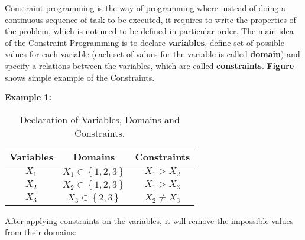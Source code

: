 Constraint programming is the way of programming where instead of doing a continuous sequence of task to be executed, it requires to write the properties of the problem, which is not need to be defined in particular order. The main idea of the Constraint Programming is to declare \textbf{variables}, define set of possible values for each variable (each set of values for the variable is called \textbf{domain}) and specify a relations between the variables, which are called \textbf{constraints}. \textbf{Figure} shows simple example of the Constraints\cite{hanbook_cp,nonogram_good,}.

\begin{addmargin}[4em]{1em}
\textbf{Example 1:}
\label{ex:example1}
\end{addmargin}
\begin{table}[h]
    \begin{center}
    \begin{tabular}{ c c c }
         \hline
         Variables & Domains & Constraints \\ 
         \hline

         $X_{1}$ & $X_{1}\in \left\{ 1,2,3\right\}$ & $X_{1}>X_{2}$ \\  
         $X_{2}$ & $X_{2}\in \left\{ 1,2,3\right\}$ & $X_{1}>X_{3}$ \\
         $X_{3}$ & $X_{3}\in \left\{ 2,3\right\}$ & $X_{2}\neq X_{3}$ 
    \end{tabular}
    \caption{Declaration of Variables, Domains and Constraints.}
    \label{table:cp}
    \end{center}
\end{table}



\begin{addmargin}[4em]{1em}
After applying constraints on the variables, it will remove the impossible values from their domains:
\end{addmargin}





